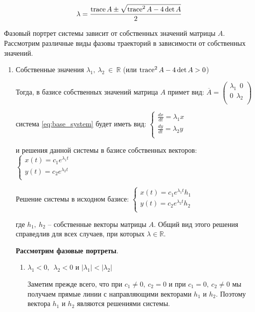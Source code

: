 \[ \lambda = \frac{\operatorname{trace} A \pm \sqrt{\operatorname{trace}^2 A - 4 \det A}}{2} \]

Фазовый портрет системы зависит от собственных значений матрицы $A$. Рассмотрим различные виды фазовы траекторий в зависимости от собственных значений.

\begin{enumerate}
  \item Собственные значения  $\lambda_1, ~ \lambda_2 ~ \in ~ \mathbb{R}$ (или $\operatorname{trace}^2 A - 4 \det A > 0$)
  
  Тогда, в базисе собственных значений матрица $A$ примет вид:
  $\overline{A} = 
  \begin{pmatrix}
    \lambda_1 ~~ 0 \\
    0 ~~ \lambda_2 \\
  \end{pmatrix}$

  система \eqref{eq:base_system} будет иметь вид:
  $\begin{cases}
    \frac{d x}{d t} = \lambda_1 x \\
    \frac{d y}{d t} = \lambda_2 y \\        
  \end{cases}$

  и решения данной системы в базисе собственных векторов:
  $\begin{cases}
    x(t) = c_1 e^{\lambda_1 t} \\
    y(t) = c_2 e^{\lambda_2 t} \\
  \end{cases}$

  Решение системы в исходном базисе:
  $\begin{cases}
    x(t) = c_1 e^{\lambda_1 t} h_1 \\
    y(t) = c_2 e^{\lambda_2 t} h_2 \\
  \end{cases}$

  где $h_1, ~ h_2$ -- собственные векторы матрицы $A$. Общий вид этого решения справедлив для всех случаев, при которых $\lambda \in \mathbb{R}$.

  \textbf{Рассмотрим фазовые портреты}.

  \begin{enumerate}
    \item $\lambda_1 < 0, ~~ \lambda_2 < 0$ и $|\lambda_1| < |\lambda_2|$
    
    Заметим прежде всего, что при $c_1 \neq 0, ~ c_2 = 0$ и при $c_1 = 0, ~ c_2 \neq 0$ мы получаем прямые линии с направляющими векторами $h_1$ и $h_2$. Поэтому вектора $h_1$ и $h_2$ являются решениями системы.


\end{enumerate}
\end{enumerate}
